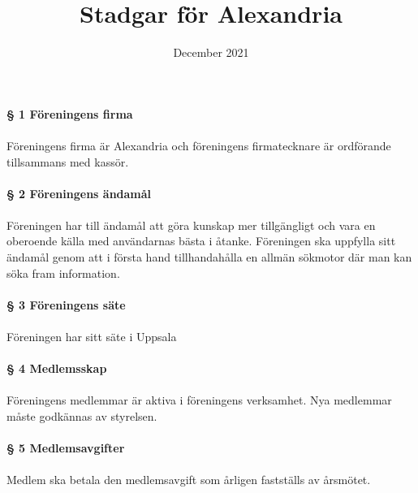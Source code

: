 \documentclass[12pt, a4paper]{article}
\title{Stadgar för Alexandria}
\date{December 2021}
\begin{document}
\maketitle

\paragraph{§ 1 Föreningens firma}
\paragraph{}
Föreningens firma är Alexandria och föreningens firmatecknare är ordförande tillsammans med kassör.

\paragraph{§ 2 Föreningens ändamål}
\paragraph{}
Föreningen har till ändamål att göra kunskap mer tillgängligt och vara en oberoende källa med användarnas bästa i åtanke. Föreningen ska uppfylla
sitt ändamål genom att i första hand tillhandahålla en allmän sökmotor där man kan söka fram information.

\paragraph{§ 3 Föreningens säte}
\paragraph{}
Föreningen har sitt säte i Uppsala

\paragraph{§ 4 Medlemsskap}
\paragraph{}
Föreningens medlemmar är aktiva i föreningens verksamhet. Nya medlemmar måste godkännas av styrelsen.

\paragraph{§ 5 Medlemsavgifter}
\paragraph{}
Medlem ska betala den medlemsavgift som årligen fastställs av årsmötet.
\end{document}
